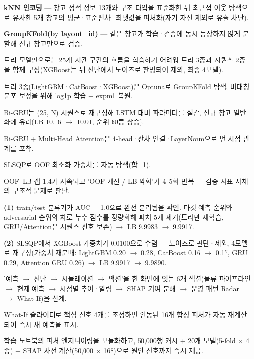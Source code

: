 \begin{substeps}
  \item \textbf{kNN 인코딩} --- 창고 정적 정보 13개와 구조 타입을 표준화한 뒤 최근접 이웃 탐색으로 유사한 5개 창고의 평균·표준편차·최댓값을 피처화(자기 자신 제외로 유출 차단).
  \item \textbf{GroupKFold(by layout\_id)} --- 같은 창고가 학습·검증에 동시 등장하지 않게 분할해 신규 창고만으로 검증.
\end{substeps}

\newpage
{}
\begin{substeps}
  \item 트리 모델만으로는 25개 시간 구간의 흐름을 학습하기 어려워 트리 3종과 시퀀스 2종을 함께 구성(XGBoost는 뒤 진단에서 노이즈로 판명되어 제외, 최종 4모델).
  \item 트리 3종(LightGBM·CatBoost·XGBoost)은 Optuna로 GroupKFold 탐색, 비대칭 분포 보정을 위해 log1p 학습 + expm1 복원.
  \item Bi-GRU는 (25, N) 시퀀스로 재구성해 LSTM 대비 파라미터를 절감, 신규 창고 일반화에 유리(LB 10.16 $\to$ 10.01, 순위 60등 상승).
  \item Bi-GRU + Multi-Head Attention은 4-head·잔차 연결·LayerNorm으로 먼 시점 관계를 포착.
  \item SLSQP로 OOF 최소화 가중치를 자동 탐색(합=1).
\end{substeps}

\begin{substeps}
  \item OOF--LB 갭 1.4가 지속되고 'OOF 개선 / LB 악화'가 4--5회 반복 --- 검증 지표 자체의 구조적 문제로 판단.
  \item \textbf{(1)} train/test 분류기가 AUC = 1.0으로 완전 분리됨을 확인. 타깃 예측 순위와 adversarial 순위의 차로 누수 점수를 정량화해 피처 5개 제거(트리만 재학습, GRU/Attention은 시퀀스 신호 보존) $\to$ LB 9.9983 $\to$ 9.9917.
  \item \textbf{(2)} SLSQP에서 XGBoost 가중치가 0.0100으로 수렴 --- 노이즈로 판단·제외, 4모델로 재구성(가중치 재분배: LightGBM 0.20 $\to$ 0.28, CatBoost 0.16 $\to$ 0.17, GRU 0.29, Attention GRU 0.26) $\to$ LB 9.9917 $\to$ 9.9890.
\end{substeps}

\begin{substeps}
  \item '예측 $\to$ 진단 $\to$ 시뮬레이션 $\to$ 액션'을 한 화면에 잇는 6개 섹션(물류 파이프라인 $\to$ 현재 예측 $\to$ 시점별 추이·알림 $\to$ SHAP 기여 분해 $\to$ 운영 패턴 Radar $\to$ What-If)을 설계.
  \item What-If 슬라이더로 핵심 신호 4개를 조정하면 연동된 16개 합성 피처가 자동 재계산되어 즉시 새 예측을 표시.
  \item 학습 노트북의 피처 엔지니어링을 모듈화하고, 50,000행 캐시 + 20개 모델(5-fold $\times$ 4종) + SHAP 사전 계산(50,000 $\times$ 168)으로 원인 신호까지 즉시 제공.
\end{substeps}

